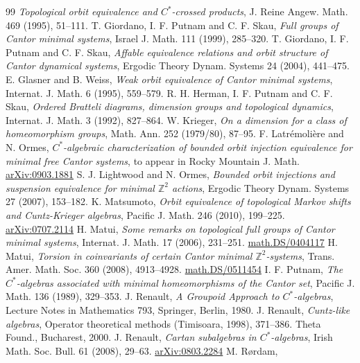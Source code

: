\documentclass[11pt]{article}
\theoremstyle{definition}
\newcommand{\Z}{\mathbb{Z}}
\begin{document}
\begin{thebibliography}{99}
\textit{Topological orbit equivalence and $C^*$-crossed products}, 
J. Reine  Angew. Math. 469 (1995), 51--111. 
T. Giordano, I. F. Putnam and C. F. Skau, 
\textit{Full groups of Cantor minimal systems}, 
Israel J. Math. 111 (1999), 285--320. 
T. Giordano, I. F. Putnam and C. F. Skau, 
\textit{Affable equivalence relations and orbit structure 
of Cantor dynamical systems}, 
Ergodic Theory Dynam. Systems 24 (2004), 441--475. 
E. Glasner and B. Weiss, 
\textit{Weak orbit equivalence of Cantor minimal systems}, 
Internat. J. Math. 6 (1995), 559--579. 
R. H. Herman, I. F. Putnam and C. F. Skau, 
\textit{Ordered Bratteli diagrams, dimension groups and 
topological dynamics}, 
Internat. J. Math. 3 (1992), 827--864. 
W. Krieger, 
\textit{On a dimension for a class of homeomorphism groups}, 
Math. Ann. 252 (1979/80), 87--95. 
F. Latr\'emoli\`ere and N. Ormes, 
\textit{$C^*$-algebraic characterization of 
bounded orbit injection equivalence for minimal free Cantor systems}, 
to appear in Rocky Mountain J. Math. 
\href{http://arxiv.org/abs/0903.1881}{arXiv:0903.1881}
S. J. Lightwood and N. Ormes, 
\textit{Bounded orbit injections and suspension equivalence 
for minimal $\Z^2$ actions}, 
Ergodic Theory Dynam. Systems 27 (2007), 153--182. 
K. Matsumoto, 
\textit{Orbit equivalence of topological Markov shifts and 
Cuntz-Krieger algebras}, 
Pacific J. Math. 246 (2010), 199--225. 
\href{http://arxiv.org/abs/0707.2114}{arXiv:0707.2114}
H. Matui, 
\textit{Some remarks on topological full groups of Cantor minimal systems}, 
Internat. J. Math. 17 (2006), 231--251. 
\href{http://arxiv.org/abs/math.DS/0404117}{math.DS/0404117}
H. Matui, 
\textit{Torsion in coinvariants of certain Cantor minimal $\Z^2$-systems}, 
Trans. Amer. Math. Soc. 360 (2008), 4913--4928. 
\href{http://arxiv.org/abs/math.DS/0511454}{math.DS/0511454}
I. F. Putnam, 
\textit{The $C^*$-algebras associated with minimal homeomorphisms of 
the Cantor set}, 
Pacific J. Math. 136 (1989), 329--353. 
J. Renault, 
\textit{A Groupoid Approach to $C^*$-algebras}, 
Lecture Notes in Mathematics 793, Springer, Berlin, 1980. 
J. Renault, 
\textit{Cuntz-like algebras}, 
Operator theoretical methods (Timisoara, 1998), 371--386. 
Theta Found., Bucharest, 2000. 
J. Renault, 
\textit{Cartan subalgebras in $C^*$-algebras}, 
Irish Math. Soc. Bull. 61 (2008), 29--63. 
\href{http://arxiv.org/abs/0803.2284}{arXiv:0803.2284}
M. R\o rdam, 

\end{thebibliography}
\end{document}
